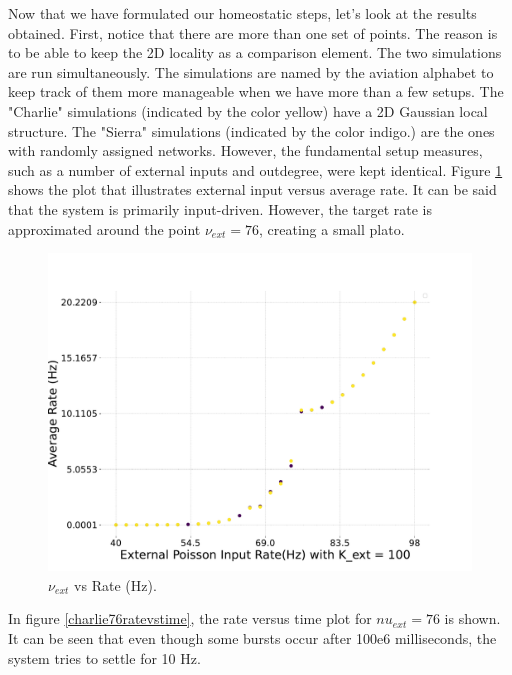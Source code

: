\documentclass[a4paper,12pt]{article}
\begin{document}
Now that we have formulated our homeostatic steps, let's look at the results obtained. First, notice that there are more than one set of points. The reason is to be able to keep the 2D locality as a comparison element. The two simulations are run simultaneously. The simulations are named by the aviation alphabet to keep track of them more manageable when we have more than a few setups. The "Charlie" simulations (indicated by the color yellow) have a 2D Gaussian local structure. The "Sierra" simulations (indicated by the color indigo.) are the ones with randomly assigned networks. However, the fundamental setup measures, such as a number of external inputs and outdegree, were kept identical. Figure \ref{charlie} shows the plot that illustrates external input versus average rate. It can be said that the system is primarily input-driven. However, the target rate is approximated around the point $\nu_{ext} = 76$, creating a small plato. 
\begin{figure}[htb!] 
    \centering
    \includegraphics[width=\linewidth]{nuext_vs_activity_charlie.pdf}
    \caption{$\nu_{ext}$ vs Rate (Hz).}
    \label{charlie}
\end{figure}
In figure \ref{charlie76ratevstime}, the rate versus time plot for $nu_{ext} = 76$ is shown. It can be seen that even though some bursts occur after 100e6 milliseconds, the system tries to settle for 10 Hz.
\end{document}
